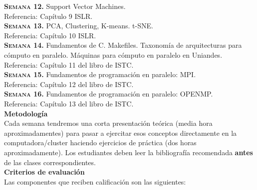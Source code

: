 \documentclass[letterpaper,10pt,onecolumn]{article}
\begin{document}
\noindent\textbf{\textsc{Semana 12.}} 
Support Vector Machines.\\
Referencia: Cap\'itulo 9 ISLR.
\\[-0.3cm] 

\noindent\textbf{\textsc{Semana 13.}} 
PCA, Clustering, K-means. t-SNE.\\
Referencia: Cap\'itulo 10 ISLR. 
\\[-0.3cm] 

\noindent\textbf{\textsc{Semana 14.}}
Fundamentos de C. Makefiles. Taxonom\'ia de arquitecturas para
c\'omputo en paralelo. M\'aquinas para c\'omputo en paralelo en
Uniandes.\\ 
Referencia: Cap\'itulo 11 del libro de ISTC. 
\\[-0.3cm]

\noindent\textbf{\textsc{Semana 15.}} 
Fundamentos de programaci\'on en paralelo: MPI.\\
Referencia: Cap\'itulo 12 del libro de ISTC.
\\[-0.3cm]  


\noindent\textbf{\textsc{Semana 16.}} 
Fundamentos de programaci\'on en paralelo: OPENMP.\\
Referencia: Cap\'itulo 13 del libro de ISTC.
\\[-0.3cm]  





\noindent\textbf{\large {} \quad
  Metodolog\'ia}\\[-0.2cm] 


\noindent\normalsize Cada semana tendremos una corta presentaci\'on
te\'orica (media hora aproximadamentes) para pasar a ejercitar esos
conceptos directamente en la computadora/cluster haciendo
ejercicios de pr\'actica (dos horas aproximadamente). 
Los estudiantes deben leer la bibliograf\'ia recomendada {\bf antes}
de las clases correspondientes.
\\[0.1cm]


\noindent\textbf{\large {} \quad Criterios de
  evaluaci\'on}\\[-0.2cm] 

Las componentes que reciben calificaci\'on son las siguientes:
\end{document}
